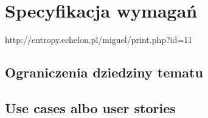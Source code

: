 \chapter{Specyfikacja wymagań}
http://entropy.echelon.pl/miguel/print.php?id=11
\section{Ograniczenia dziedziny tematu}
\section{Use cases albo user stories}
